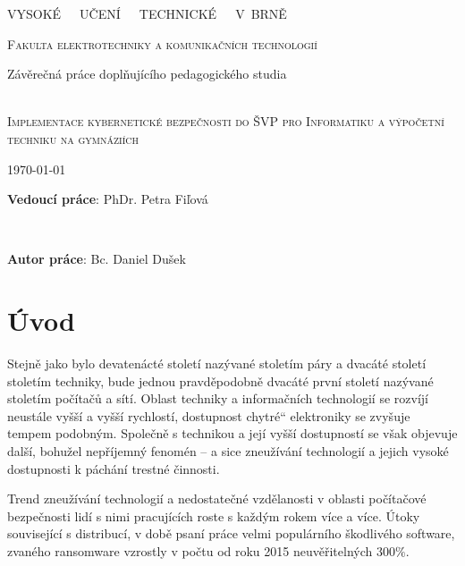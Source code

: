 \documentclass[a4paper, 12pt]{article}
\title{\thesisname}
\author{Bc. Daniel Dušek}
\providecommand{\uv}[1]{\quotedblbase #1\textquotedblleft}
\newcommand\textbox[1]{%
    \parbox{.5\textwidth}{#1}%
}
\newcommand{\thesisName}{Implementace kybernetické bezpečnosti do ŠVP pro Informatiku a výpočetní techniku na gymnáziích}
\newcommand{\universityName}{VYSOKÉ~~~UČENÍ~~~TECHNICKÉ~~~V~BRNĚ}
\newcommand{\facultyName}{Fakulta elektrotechniky a komunikačních technologií}
\begin{document}
\thispagestyle{empty}
    \begin{center}
        \Huge
        \universityName \\
        
        \LARGE
        \textsc{\facultyName\\}
        
        \Large{Závěrečná práce doplňujícího pedagogického studia \\ ~ \\}
        
        \LARGE
        \textsc{\thesisName}
    \end{center}

        \noindent \textbox{\today}  \textbox{\hfill \textbf{Vedoucí práce}: PhDr. Petra Fiľová} \\
        \noindent \textbox{\hfill}  \textbox{\hfill \textbf{Autor práce}: Bc. Daniel Dušek ~~~~~}
\clearpage
\restoregeometry

\newpage
\thispagestyle{empty}
\tableofcontents

\newpage
\setcounter{page}{1}
\section{Úvod}

Stejně jako bylo devatenácté století nazývané stoletím páry a dvacáté století stoletím techniky, bude jednou pravděpodobně dvacáté první století nazývané stoletím počítačů a sítí. Oblast techniky a informačních technologií se rozvíjí neustále vyšší a vyšší rychlostí, dostupnost \uv{chytré} elektroniky se zvyšuje tempem podobným. Společně s technikou a její vyšší dostupností se však objevuje další, bohužel nepříjemný fenomén -- a sice zneužívání technologií a jejich vysoké dostupnosti k páchání trestné činnosti. 

Trend zneužívání technologií a nedostatečné vzdělanosti v oblasti počítačové bezpečnosti lidí s nimi pracujících roste s každým rokem více a více. Útoky související s distribucí, v době psaní práce velmi populárního škodlivého software, zvaného ransomware vzrostly v počtu od roku 2015 neuvěřitelných 300$\%$.
\end{document}
